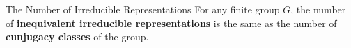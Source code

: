 %
%    
%    
%
%
%    
%

\begin{frame}{The Number of Irreducible Representations}
    For any finite group $G$, the number of \textbf{inequivalent irreducible representations} is the same as the number of \textbf{cunjugacy classes} of the group.

    {\hspace*{\fill} \cite{fulton2013}}
    
\end{frame}

